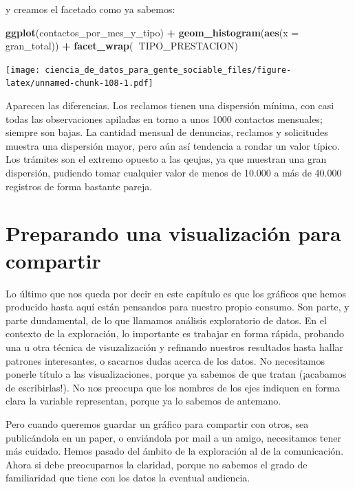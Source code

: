 \documentclass[]{book}
\newenvironment{Shaded}{\begin{snugshade}}{\end{snugshade}}
\newcommand{\KeywordTok}[1]{\textcolor[rgb]{0.13,0.29,0.53}{\textbf{#1}}}
\newcommand{\DataTypeTok}[1]{\textcolor[rgb]{0.13,0.29,0.53}{#1}}
\newcommand{\StringTok}[1]{\textcolor[rgb]{0.31,0.60,0.02}{#1}}
\newcommand{\OperatorTok}[1]{\textcolor[rgb]{0.81,0.36,0.00}{\textbf{#1}}}
\newcommand{\NormalTok}[1]{#1}
\begin{document}
y creamos el facetado como ya sabemos:

\begin{Shaded}
\begin{Highlighting}[]
\KeywordTok{ggplot}\NormalTok{(contactos_por_mes_y_tipo) }\OperatorTok{+}\StringTok{ }
\StringTok{    }\KeywordTok{geom_histogram}\NormalTok{(}\KeywordTok{aes}\NormalTok{(}\DataTypeTok{x =}\NormalTok{ gran_total)) }\OperatorTok{+}
\StringTok{    }\KeywordTok{facet_wrap}\NormalTok{(}\OperatorTok{~}\NormalTok{TIPO_PRESTACION)}
\end{Highlighting}
\end{Shaded}

\texttt{[image: ciencia\_de\_datos\_para\_gente\_sociable\_files/figure-latex/unnamed-chunk-108-1.pdf]}

Aparecen las diferencias. Los reclamos tienen una dispersión mínima, con
casi todas las observaciones apiladas en torno a unos 1000 contactos
mensuales; siempre son bajas. La cantidad mensual de denuncias, reclamos
y solicitudes muestra una dispersión mayor, pero aún así tendencia a
rondar un valor típico. Los trámites son el extremo opuesto a las
qeujas, ya que muestran una gran dispersión, pudiendo tomar cualquier
valor de menos de 10.000 a más de 40.000 registros de forma bastante
pareja.

\section{Preparando una visualización para
compartir}\label{preparando-una-visualizacion-para-compartir}

Lo último que nos queda por decir en este capítulo es que los gráficos
que hemos producido hasta aquí están pensandos para nuestro propio
consumo. Son parte, y parte dundamental, de lo que llamamos análisis
exploratorio de datos. En el contexto de la exploración, lo importante
es trabajar en forma rápida, probando una u otra técnica de
visuzalización y refinando nuestros resultados hasta hallar patrones
interesantes, o sacarnos dudas acerca de los datos. No necesitamos
ponerle título a las visualizaciones, porque ya sabemos de que tratan
(¡acabamos de escribirlas!). No nos preocupa que los nombres de los ejes
indiquen en forma clara la variable representan, porque ya lo sabemos de
antemano.

Pero cuando queremos guardar un gráfico para compartir con otros, sea
publicándola en un paper, o enviándola por mail a un amigo, necesitamos
tener más cuidado. Hemos pasado del ámbito de la exploración al de la
comunicación. Ahora si debe preocuparnos la claridad, porque no sabemos
el grado de familiaridad que tiene con los datos la eventual audiencia.
\end{document}
